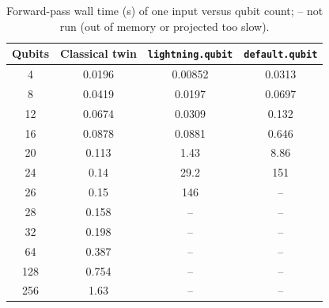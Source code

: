 \begin{table}[tbp]
\centering
\caption{Forward-pass wall time (s) of one input versus qubit count; -- not run (out of memory or projected too slow).}
\label{tab:s_twin_scaling}
\small
\begin{tabular}{cccc}
\toprule
Qubits & Classical twin & \texttt{lightning.qubit} & \texttt{default.qubit} \\
\midrule
\num{4} & \num{0.0196} & \num{0.00852} & \num{0.0313} \\
\num{8} & \num{0.0419} & \num{0.0197} & \num{0.0697} \\
\num{12} & \num{0.0674} & \num{0.0309} & \num{0.132} \\
\num{16} & \num{0.0878} & \num{0.0881} & \num{0.646} \\
\num{20} & \num{0.113} & \num{1.43} & \num{8.86} \\
\num{24} & \num{0.14} & \num{29.2} & \num{151} \\
\num{26} & \num{0.15} & \num{146} & -- \\
\num{28} & \num{0.158} & -- & -- \\
\num{32} & \num{0.198} & -- & -- \\
\num{64} & \num{0.387} & -- & -- \\
\num{128} & \num{0.754} & -- & -- \\
\num{256} & \num{1.63} & -- & -- \\
\bottomrule
\end{tabular}
\end{table}
